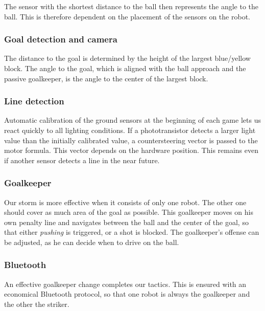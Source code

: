 The sensor with the shortest distance to the ball then represents the angle to the ball. This is therefore dependent on the placement of the sensors on the robot.

\subsubsection{Goal detection and camera}
The distance to the goal is determined by the height of the largest blue/yellow block.
The angle to the goal, which is aligned with the ball approach and the passive goalkeeper, is the angle to the center of the largest block. 

\subsubsection{Line detection}
Automatic calibration of the ground sensors at the beginning of each game lets us react quickly to all lighting conditions. 
If a phototransistor detects a larger light value than the initially calibrated value, a countersteering vector is passed to the motor formula. 
This vector depends on the hardware position. This remains even if another sensor detects a line in the near future.

\subsubsection{Goalkeeper}
Our storm is more effective when it consists of only one robot. The other one should cover as much area of the goal as possible.
This goalkeeper moves on his own penalty line and navigates between the ball and the center of the goal, so that either \textit{pushing} is triggered, or a shot is blocked.
The goalkeeper's offense can be adjusted, as he can decide when to drive on the ball. 

\subsubsection{Bluetooth}
An effective goalkeeper change completes our tactics. This is ensured with an economical Bluetooth protocol, so that one robot is always the goalkeeper and the other the striker. 